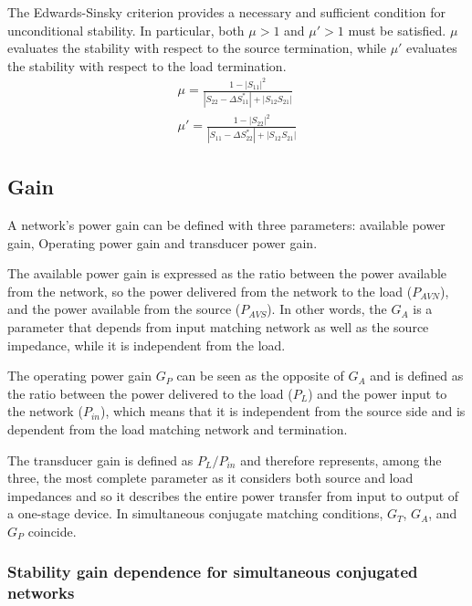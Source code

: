 The Edwards-Sinsky criterion provides a necessary and sufficient condition for unconditional stability.  
In particular, both $\mu>1$ and $\mu'>1$ must be satisfied.  
$\mu$ evaluates the stability with respect to the source termination, while $\mu'$ evaluates the stability with respect to the load termination.
\begin{align}
    \mu=\frac{1-\left|S_{11}\right|^2}{\left|S_{22}-\Delta S_{11}^*\right|+\left|S_{12}S_{21}\right|}\\
    \mu'=\frac{1-\left|S_{22}\right|^2}{\left|S_{11}-\Delta S_{22}^*\right|+\left|S_{12}S_{21}\right|}
\end{align}

\subsection{Gain}
A network's power gain can be defined with three parameters: available power gain, Operating power gain and transducer power gain. 

The available power gain is expressed as the ratio between the power available from the network, so the power delivered from the network to the load ($P_{AVN}$), and the power available from the source ($P_{AVS}$). In other words, the $G_A$ is a parameter that depends from input matching network as well as the source impedance, while it is independent from the load.

The operating power gain $G_P$ can be seen as the opposite of $G_A$ and is defined as the ratio between the power delivered to the load ($P_{L}$) and the power input to the network ($P_{in}$), which means that it is independent from the source side and is dependent from the load matching network and termination. 

The transducer gain is defined as $P_L/P_{in}$ and therefore represents, among the three, the most complete parameter as it considers both source and load impedances \cite{Revisiting the Power Gains of a Loaded Two-Port} and so it describes the entire power transfer from input to output of a one-stage device.
In simultaneous conjugate matching conditions, $G_T$, $G_A$, and $G_P$ coincide.

\subsubsection{Stability gain dependence for simultaneous conjugated networks}

